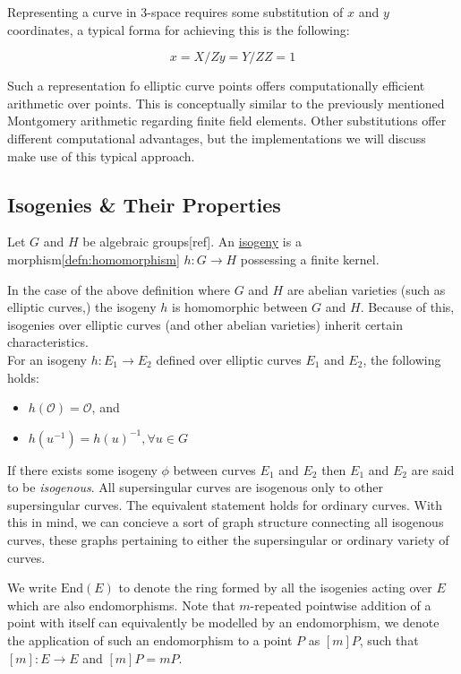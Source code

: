 Representing a curve in 3-space requires some substitution of $x$ and $y$ coordinates, a typical forma for achieving this is the following:

$$
x = X/Z
y = Y/Z
Z = 1
$$

Such a representation fo elliptic curve points offers computationally efficient arithmetic over points. This is conceptually similar to the previously mentioned Montgomery arithmetic regarding finite field elements. Other substitutions offer different computational advantages, but the implementations we will discuss make use of this typical approach.

\subsection{Isogenies \& Their Properties}

\begin{tcolorbox}
\begin{definition}[Isogeny]
\label{defn:isogeny}
Let $G$ and $H$ be algebraic groups[ref]. An \underline{isogeny} is a morphism\ref{defn:homomorphism} $h: G \rightarrow H$ possessing a finite kernel.
\end{definition}
\end{tcolorbox}

In the case of the above definition where $G$ and $H$ are abelian varieties (such as elliptic curves,) the isogeny $h$ is homomorphic between $G$ and $H$. Because of this, isogenies over elliptic curves (and other abelian varieties) inherit certain characteristics.\\
For an isogeny $h: E_{1} \rightarrow E_{2}$ defined over elliptic curves $E_1$ and $E_2$, the following holds:
\begin{itemize}
\item $h(\mathcal{O}) = \mathcal{O}$, and
\item $h(u^{-1}) = h(u)^{-1}, \forall u \in G$
\end{itemize}

If there exists some isogeny $\phi$ between curves $E_1$ and $E_2$ then $E_1$ and $E_2$ are said to be \emph{isogenous}. All supersingular curves are isogenous only to other supersingular curves. The equivalent statement holds for ordinary curves. With this in mind, we can concieve a sort of graph structure connecting all isogenous curves, these graphs pertaining to either the supersingular or ordinary variety of curves. 

We write $\text{End}(E)$ to denote the ring formed by all the isogenies acting over $E$ which are also endomorphisms. Note that $m$-repeated pointwise addition of a point with itself can equivalently be modelled by an endomorphism, we denote the application of such an endomorphism to a point $P$ as $[m]P$, such that $[m]: E \rightarrow E$ and $[m]P = mP$.

